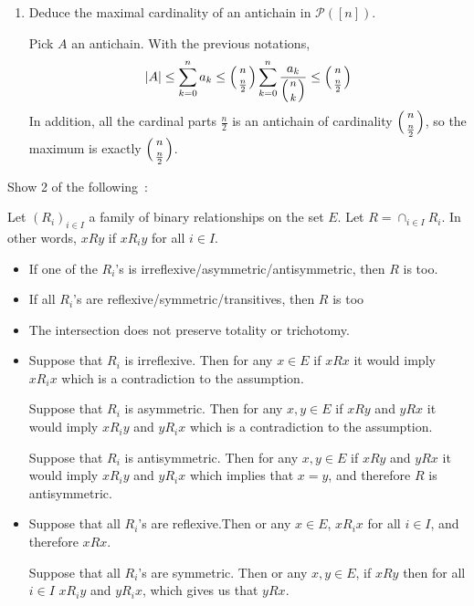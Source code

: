 \documentclass[a4paper,11pt]{exam}
\renewcommand{\binom}{\mbinom}
\begin{document}
\begin{questions}
\begin{enumerate}
			\item Deduce the maximal cardinality of an antichain in $ \mathcal{P}([n])$.
			
			\begin{solution}
				Pick $A$ an antichain. 
				With the previous notations,
				\[
				|A| \leq \sum_{k=0}^n a_k \leq
				\binom{n}{\frac{n}{2}} \sum_{k=0}^n \frac{a_k}{\binom{n}{k}} \leq
				\binom{n}{\frac{n}{2}}
				\]
				In addition, all the cardinal parts $\frac{n}{2}$ is an
				antichain  of cardinality $\binom{n}{\frac{n}{2}}$, so the maximum is exactly $\binom{n}{\frac{n}{2}}$.
			\end{solution}
		\end{enumerate}
		
		
		
		
		
		\question
		Show 2 of the following~:
		
		Let $(R_i)_{i \in I}$ a family of binary relationships on the set $E$.
		Let $R = \cap_{i \in I}R_i$. In other words, $xRy$ if $xR_iy$ for all $i\in I$.
		\begin{itemize}
			\item If one of the $R_i$'s is irreflexive/asymmetric/antisymmetric, then $R$ is too.
			\item If all $R_i$'s are reflexive/symmetric/transitives, then $R$ is too
			\item The intersection does not preserve totality or trichotomy.
		\end{itemize}
		
		\begin{solution}
			\begin{itemize}
				\item Suppose that $R_i$ is irreflexive. Then for any $x\in E$ if $xRx$ it would imply $xR_ix$ which is a contradiction to the assumption.
				
				Suppose that $R_i$ is asymmetric. Then for any $x,y\in E$ if $xRy$ and $yRx$ it would imply $xR_iy$ and $yR_ix$  which is a contradiction to the assumption.
				
				Suppose that $R_i$ is antisymmetric. Then for any $x,y\in E$ if $xRy$ and $yRx$ it would imply $xR_iy$ and $yR_ix$  which implies that $x=y$, and therefore $R$ is antisymmetric.
				
				
				\item Suppose that all $R_i$'s are reflexive.Then or any $x\in E$, $xR_ix$ for all $i \in I$, and therefore $xRx$.
				
				Suppose that all $R_i$'s are symmetric. Then or any $x,y\in E$, if $xRy$ then for all $i \in I$ $xR_iy$ and $yR_ix$,  which gives us that $yRx$.
				

\end{itemize}
\end{solution}
\end{questions}
\end{document}
